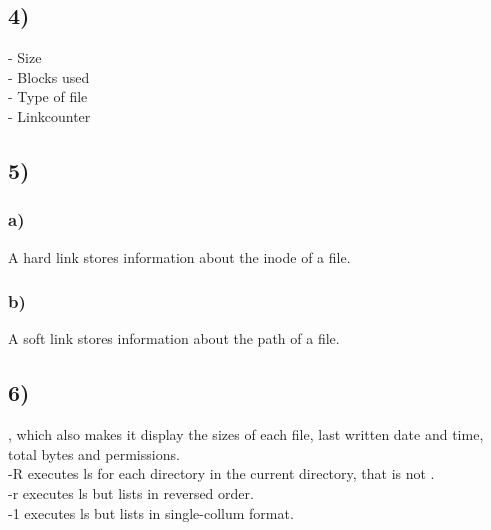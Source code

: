 \documentclass[12pt, a4paper]{article}
\begin{document}
\subsection*{4)}
- Size \\
- Blocks used \\
- Type of file \\
- Linkcounter
\subsection*{5)}
\subsubsection*{a)}
A hard link stores information about the inode of a file.
\subsubsection*{b)}
A soft link stores information about the path of a file.
\subsection*{6)}
, which also makes it display the sizes of each file, last written date and time, total bytes and permissions. \\
-R executes ls for each directory in the current directory, that is not . \\
-r executes ls but lists in reversed order. \\
-1 executes ls but lists in single-collum format.
\end{document}
